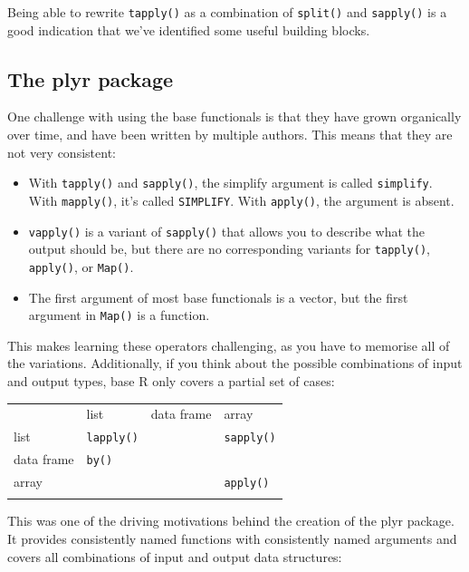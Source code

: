 Being able to rewrite \texttt{tapply()} as a combination of
\texttt{split()} and \texttt{sapply()} is a good indication that we've
identified some useful building blocks. 

\subsection{The plyr package}

One challenge with using the base functionals is that they have grown
organically over time, and have been written by multiple authors. This
means that they are not very consistent: 

\begin{itemize}
\item
  With \texttt{tapply()} and \texttt{sapply()}, the simplify argument is
  called \texttt{simplify}. With \texttt{mapply()}, it's called
  \texttt{SIMPLIFY}. With \texttt{apply()}, the argument is absent.
\item
  \texttt{vapply()} is a variant of \texttt{sapply()} that allows you to
  describe what the output should be, but there are no corresponding
  variants for \texttt{tapply()}, \texttt{apply()}, or \texttt{Map()}.
\item
  The first argument of most base functionals is a vector, but the first
  argument in \texttt{Map()} is a function.
\end{itemize}

This makes learning these operators challenging, as you have to memorise
all of the variations. Additionally, if you think about the possible
combinations of input and output types, base R only covers a partial set
of cases:

\begin{longtable}[c]{@{}llll@{}}
\toprule\addlinespace
& list & data frame & array
\\\addlinespace
\midrule\endhead
list & \texttt{lapply()} & & \texttt{sapply()}
\\\addlinespace
data frame & \texttt{by()} & &
\\\addlinespace
array & & & \texttt{apply()}
\\\addlinespace
\bottomrule
\end{longtable}

This was one of the driving motivations behind the creation of the plyr
package. It provides consistently named functions with consistently
named arguments and covers all combinations of input and output data
structures:

